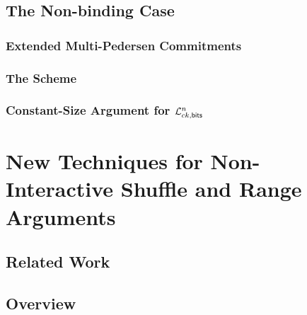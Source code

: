             

    \section{The Non-binding Case} \label{sec:bits-non-binding}

        

        \subsection{Extended Multi-Pedersen Commitments} \label{sec:ext-mp}

            

        \subsection{The Scheme} \label{sec:bits-scheme-nb}

            

        \subsection{Constant-Size Argument for $\mathcal{L}_{ck,\mathsf{bits}}^n$} \label{sec:matr-bits}

            


\chapter{New Techniques for Non-Interactive Shuffle and Range Arguments} \label{sec:shuf-rp}

    

    \section{Related Work} \label{sec:set-memb-rel-work}

        

    \section{Overview} \label{sec:shuf-rp-overview}

        

